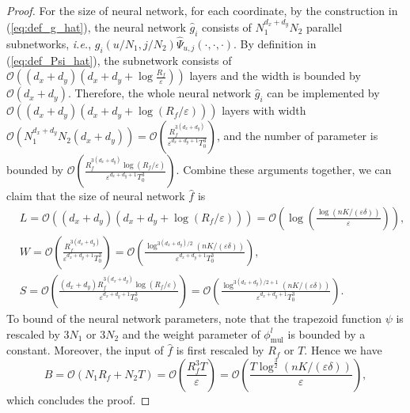 \documentclass[11pt]{article}
\numberwithin{equation}{section}
\renewcommand{\eqref}[1]{(\ref{#1})}
\begin{document}
\begin{proof}
    For the size of neural network, for each coordinate, by the construction in \eqref{eq:def_g_hat}, the neural network $\widehat{g}_i$ consists of $N_1^{d_x+d_y}N_2$ parallel subnetworks, \textit{i.e.}, $g_i(u/N_1,j/N_2)\widehat{\Psi}_{u,j}(\cdot,\cdot,\cdot)$. By definition in \eqref{eq:def_Psi_hat}, the subnetwork consists of $\mathcal{O}\left((d_x+d_y)(d_x+d_y+\log\frac{R_f}{\varepsilon})\right)$ layers and the width is bounded by $\mathcal{O}(d_x+d_y)$.
    Therefore, the whole neural network $\widehat{g}_i$ can be implemented by $\mathcal{O}\left((d_x+d_y)(d_x+d_y+\log(R_f/\varepsilon))\right)$ layers with width $\mathcal{O}\left(N_1^{d_x+d_y}N_2(d_x+d_y)\right)=\mathcal{O}\left(\frac{R_f^{3(d_x+d_y)}}{\varepsilon^{d_x+d_y+1}T_0^3}\right)$, and the number of parameter is bounded by $\mathcal{O}\left(\frac{R_f^{3(d_x+d_y)}\log(R_f/\varepsilon)}{\varepsilon^{d_x+d_y+1}T_0^3}\right)$.
    Combine these arguments together, we can claim that the size of neural network $\widehat{f}$ is
    \begin{equation}
        \begin{aligned}
            &L=\mathcal{O}\left((d_x+d_y)(d_x+d_y+\log(R_f/\varepsilon))\right)=\mathcal{O}\left(\log\left(\frac{\log(nK/(\varepsilon\delta))}{\varepsilon}\right)\right), \\
            &W=\mathcal{O}\left(\frac{R_f^{3(d_x+d_y)}}{\varepsilon^{d_x+d_y+1}T_0^3}\right)=\mathcal{O}\left(\frac{\log^{3(d_x+d_y)/2}(nK/(\varepsilon\delta))}{\varepsilon^{d_x+d_y+1}T_0^3}\right),\\
            &S=\mathcal{O}\left(\frac{(d_x+d_y)R_f^{3(d_x+d_y)}\log(R_f/\varepsilon)}{\varepsilon^{d_x+d_y+1}T_0^3}\right)=\mathcal{O}\left(\frac{\log^{3(d_x+d_y)/2+1}(nK/(\varepsilon\delta))}{\varepsilon^{d_x+d_y+1}T_0^3}\right).
        \end{aligned}
    \end{equation}
    To bound of the neural network parameters, note that the trapezoid function $\psi$ is rescaled by $3N_1$ or $3N_2$ and the weight parameter of $\phi_{\text{mul}}^l$ is bounded by a constant. 
    Moreover, the input of $\widehat{f}$ is first rescaled by $R_f$ or $T$. 
    Hence we have
    \begin{equation}
        B=\mathcal{O}\left(N_1R_f+N_2T\right)=\mathcal{O}\left(\frac{R_f^3T}{\varepsilon}\right)=\mathcal{O}\left(\frac{T\log^{\frac{3}{2}}(nK/(\varepsilon\delta))}{\varepsilon}\right),
    \end{equation}
    which concludes the proof. 
\end{proof}
\end{document}
